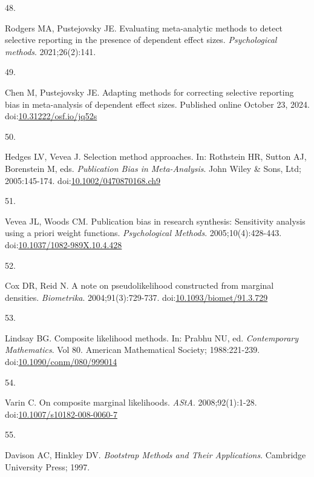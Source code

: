\documentclass[
  american,
  man, donotrepeattitle,floatsintext]{apa7}
\newlength{\cslhangindent}
\newlength{\csllabelwidth}
\newenvironment{CSLReferences}[2] %
 {\begin{list}{}{%
  \setlength{\itemindent}{0pt}
  \setlength{\leftmargin}{0pt}
  \setlength{\parsep}{0pt}
  \ifodd #1
   \setlength{\leftmargin}{\cslhangindent}
   \setlength{\itemindent}{-1\cslhangindent}
  \fi
  \setlength{\itemsep}{#2\baselineskip}}}
 {\end{list}}
\newcommand{\CSLLeftMargin}[1]{\parbox[t]{\csllabelwidth}{\strut#1\strut}}
\newcommand{\CSLRightInline}[1]{\parbox[t]{\linewidth - \csllabelwidth}{\strut#1\strut}}
\begin{document}
\begin{CSLReferences}{0}{1}
\CSLLeftMargin{48. }%
\CSLRightInline{Rodgers MA, Pustejovsky JE. Evaluating meta-analytic methods to detect selective reporting in the presence of dependent effect sizes. \emph{Psychological methods}. 2021;26(2):141.}

\CSLLeftMargin{49. }%
\CSLRightInline{Chen M, Pustejovsky JE. Adapting methods for correcting selective reporting bias in meta-analysis of dependent effect sizes. Published online October 23, 2024. doi:\href{https://doi.org/10.31222/osf.io/jq52s}{10.31222/osf.io/jq52s}}

\CSLLeftMargin{50. }%
\CSLRightInline{Hedges LV, Vevea J. Selection method approaches. In: Rothstein HR, Sutton AJ, Borenstein M, eds. \emph{Publication Bias in Meta-Analysis}. {John Wiley \& Sons, Ltd}; 2005:145-174. doi:\href{https://doi.org/10.1002/0470870168.ch9}{10.1002/0470870168.ch9}}

\CSLLeftMargin{51. }%
\CSLRightInline{Vevea JL, Woods CM. Publication bias in research synthesis: Sensitivity analysis using a priori weight functions. \emph{Psychological Methods}. 2005;10(4):428-443. doi:\href{https://doi.org/10.1037/1082-989X.10.4.428}{10.1037/1082-989X.10.4.428}}

\CSLLeftMargin{52. }%
\CSLRightInline{Cox DR, Reid N. A note on pseudolikelihood constructed from marginal densities. \emph{Biometrika}. 2004;91(3):729-737. doi:\href{https://doi.org/10.1093/biomet/91.3.729}{10.1093/biomet/91.3.729}}

\CSLLeftMargin{53. }%
\CSLRightInline{Lindsay BG. Composite likelihood methods. In: Prabhu NU, ed. \emph{Contemporary {Mathematics}}. Vol 80. American Mathematical Society; 1988:221-239. doi:\href{https://doi.org/10.1090/conm/080/999014}{10.1090/conm/080/999014}}

\CSLLeftMargin{54. }%
\CSLRightInline{Varin C. On composite marginal likelihoods. \emph{AStA}. 2008;92(1):1-28. doi:\href{https://doi.org/10.1007/s10182-008-0060-7}{10.1007/s10182-008-0060-7}}

\CSLLeftMargin{55. }%
\CSLRightInline{Davison AC, Hinkley DV. \emph{Bootstrap Methods and Their Applications}. Cambridge University Press; 1997.}


\end{CSLReferences}
\end{document}
